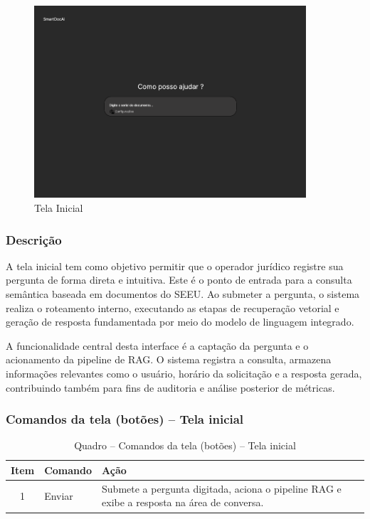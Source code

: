 \begin{description}
\begin{figure}[H]
  \centering
  \includegraphics[width=0.9\textwidth]{04-figuras/inicio.png}
  \caption{Tela Inicial}
  \label{fig:tela-inical}
\end{figure}


\subsubsection{Descrição}

A tela inicial tem como objetivo permitir que o operador jurídico registre sua pergunta de forma direta e intuitiva. Este é o ponto de entrada para a consulta semântica baseada em documentos do SEEU. Ao submeter a pergunta, o sistema realiza o roteamento interno, executando as etapas de recuperação vetorial e geração de resposta fundamentada por meio do modelo de linguagem integrado.

A funcionalidade central desta interface é a captação da pergunta e o acionamento da pipeline de RAG. O sistema registra a consulta, armazena informações relevantes como o usuário, horário da solicitação e a resposta gerada, contribuindo também para fins de auditoria e análise posterior de métricas.

\subsubsection{Comandos da tela (botões) – Tela inicial}

\begin{table}[H]
  \centering
  \caption{Quadro – Comandos da tela (botões) – Tela inicial}
  \label{tab:cmd_tela_inicial}
  \begin{tabular}{|c|p{4cm}|p{8cm}|}
    \hline
    \textbf{Item} & \textbf{Comando} & \textbf{Ação} \\ \hline
    1 & Enviar & Submete a pergunta digitada, aciona o pipeline RAG e exibe a resposta na área de conversa. \\ \hline
  \end{tabular}
\end{table}



\end{description}
